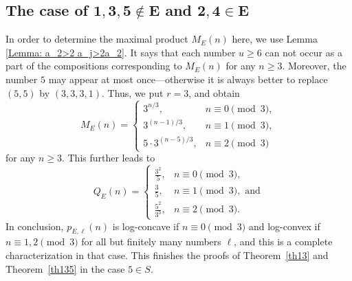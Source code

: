 \documentclass[12pt]{amsart}
\theoremstyle{definition}
\theoremstyle{remark}
\numberwithin{theorem}{section} \numberwithin{equation}{section}
\begin{document}
\subsection{The case of $\mathbf{1,3,5 \not\in E}$ and $\mathbf{2,4\in E}$}
\label{subsection44}
In order to determine the maximal product $M_E(n)$ here, we use Lemma \ref{Lemma: a_2>2 a_j>2a_2}. It says that each number $u\geq6$ can not occur as a part of the compositions corresponding to $M_E(n)$ for any $n\geq3$. Moreover, the number $5$ may appear at most once---otherwise it is always better to replace $(5,5)$ by $(3,3,3,1)$. Thus, we put $r=3$, and obtain
\[
M_{E}\left( n\right) =\left\{
\begin{array}{ll}
3^{n/3}, & n\equiv 0\pmod{3}, \\
3^{(n-1)/3}, & n\equiv 1\pmod{3}, \\
5\cdot3^{(n-5)/3}, & n\equiv 2\pmod{3}
\end{array}
\right.
\]
for any $n\geq3$.
This further leads to 
\begin{equation*}
Q_{E}\left( n\right) =\left\{
\begin{array}{ll}
\frac{3^2}{5}, & n\equiv 0\pmod{3}, \\
\frac{3}{5}, & n\equiv 1\pmod{3}, \text{ and} \\
\frac{5^2}{3^3}, & n\equiv 2\pmod{3}.
\end{array}
\right.
\end{equation*}
In conclusion, $p_{E,\ell }(n)$ is log-concave if $n\equiv0\pmod{3}$ and log-convex if $n\equiv1,2\pmod{3}$ for all but finitely many numbers $\ell$, and this is a complete characterization in that case.
This finishes the proofs of
Theorem~\ref{th13}
and Theorem~\ref{th135} in the
case $5\in S$.
\end{document}
